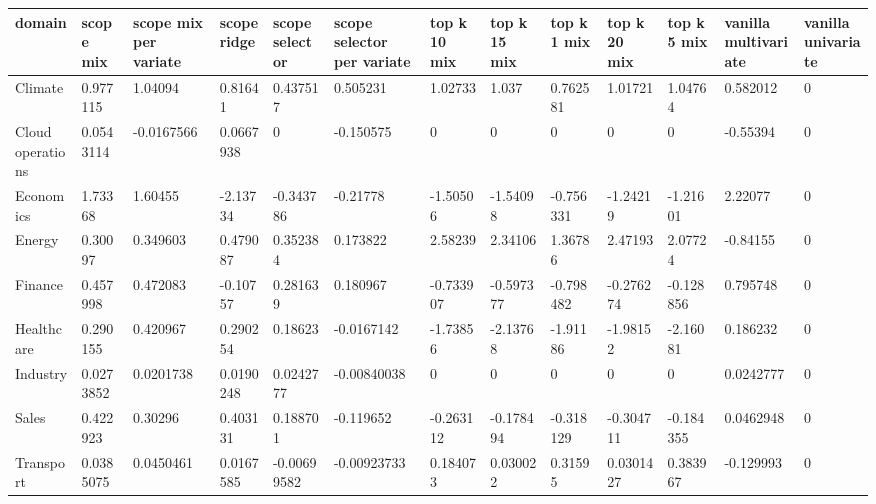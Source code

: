 \begin{tabular}{lllllllllllll}
\toprule
domain & scope mix & scope mix per variate & scope ridge & scope selector & scope selector per variate & top k 10 mix & top k 15 mix & top k 1 mix & top k 20 mix & top k 5 mix & vanilla multivariate & vanilla univariate \\
\midrule
Climate & 0.977115 & 1.04094 & 0.81641 & 0.437517 & 0.505231 & 1.02733 & 1.037 & 0.762581 & 1.01721 & 1.04764 & 0.582012 & 0 \\
Cloud operations & 0.0543114 & -0.0167566 & 0.0667938 & 0 & -0.150575 & 0 & 0 & 0 & 0 & 0 & -0.55394 & 0 \\
Economics & 1.73368 & 1.60455 & -2.13734 & -0.343786 & -0.21778 & -1.50506 & -1.54098 & -0.756331 & -1.24219 & -1.21601 & 2.22077 & 0 \\
Energy & 0.30097 & 0.349603 & 0.479087 & 0.352384 & 0.173822 & 2.58239 & 2.34106 & 1.36786 & 2.47193 & 2.07724 & -0.84155 & 0 \\
Finance & 0.457998 & 0.472083 & -0.10757 & 0.281639 & 0.180967 & -0.733907 & -0.597377 & -0.798482 & -0.276274 & -0.128856 & 0.795748 & 0 \\
Healthcare & 0.290155 & 0.420967 & 0.290254 & 0.18623 & -0.0167142 & -1.73856 & -2.13768 & -1.91186 & -1.98152 & -2.16081 & 0.186232 & 0 \\
Industry & 0.0273852 & 0.0201738 & 0.0190248 & 0.0242777 & -0.00840038 & 0 & 0 & 0 & 0 & 0 & 0.0242777 & 0 \\
Sales & 0.422923 & 0.30296 & 0.403131 & 0.188701 & -0.119652 & -0.263112 & -0.178494 & -0.318129 & -0.304711 & -0.184355 & 0.0462948 & 0 \\
Transport & 0.0385075 & 0.0450461 & 0.0167585 & -0.00699582 & -0.00923733 & 0.184073 & 0.030022 & 0.31595 & 0.0301427 & 0.383967 & -0.129993 & 0 \\
\bottomrule
\end{tabular}
